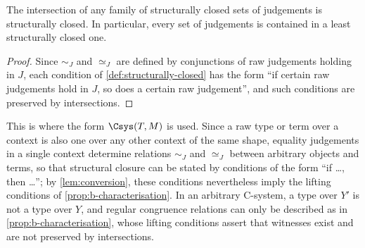 \begin{lemma}\label{lem:closed-intersections}
    The intersection of any family of structurally closed sets of judgements is structurally closed. In particular, every set of judgements is contained in a least structurally closed one.
\end{lemma}

\begin{proof}
    Since $\sim_J$ and $\simeq_J$ are defined by conjunctions of raw judgements holding in $J$, each condition of \cref{def:structurally-closed} has the form ``if certain raw judgements hold in $J$, so does a certain raw judgement'', and such conditions are preserved by intersections.
\end{proof}

This is where the form $\Csys(T, M)$ is used. Since a raw type or term over a context is also one over any other context of the same shape, equality judgements in a single context determine relations $\sim_J$ and $\simeq_J$ between arbitrary objects and terms, so that structural closure can be stated by conditions of the form ``if \ldots, then \ldots''; by \cref{lem:conversion}, these conditions nevertheless imply the lifting conditions of \cref{prop:b-characterisation}. In an arbitrary C-system, a type over $Y'$ is not a type over $Y$, and regular congruence relations can only be described as in \cref{prop:b-characterisation}, whose lifting conditions assert that witnesses exist and are not preserved by intersections.
